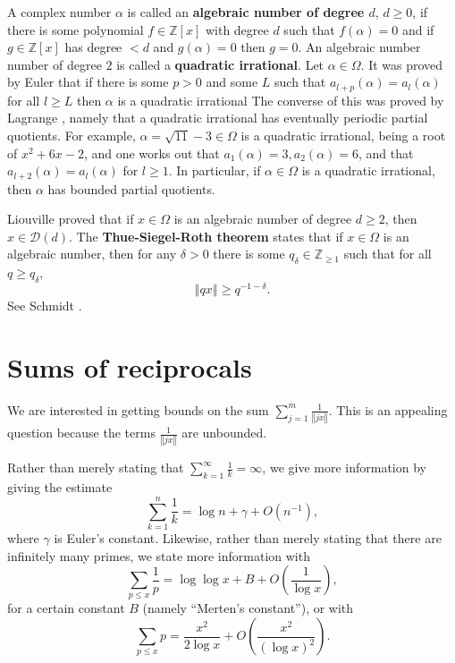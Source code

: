 \documentclass{amsart}
\newcommand{\norm}[1]{\left\Vert #1 \right\Vert}
\begin{document}
A complex number $\alpha$ is called an \textbf{algebraic number of degree $d$}, $d \geq 0$, if there is some polynomial $f \in \mathbb{Z}[x]$ with degree $d$ such that 
$f(\alpha)=0$ and if $g \in \mathbb{Z}[x]$ has degree $<d$ and $g(\alpha)=0$ then $g=0$. 
An algebraic number number of degree $2$ is called a \textbf{quadratic irrational}. 
Let $\alpha \in \Omega$. It was proved by Euler \cite[p.~144, Theorem 176]{wright} that if there is some $p>0$ and some $L$ such that $a_{l+p}(\alpha)=a_l(\alpha)$ for all $l \geq L$ then $\alpha$ is a quadratic irrational The converse of this was proved by Lagrange \cite[p.~144, Theorem 177]{wright},
namely that a quadratic irrational has eventually periodic 
partial quotients.
For example, $\alpha=\sqrt{11}-3 \in \Omega$ is a quadratic irrational, being a root of 
$x^2+6x-2$,
 and one works out
that $a_1(\alpha)=3, a_2(\alpha)=6$, and that $a_{l+2}(\alpha)=a_l(\alpha)$ for $l \geq 1$. 
In particular, if $\alpha \in \Omega$ is a quadratic irrational, then $\alpha$ has bounded partial quotients. 


Liouville \cite[p.~161, Theorem 191]{wright} proved that if $x \in \Omega$ is an algebraic number of degree $d \geq 2$,
then $x \in \mathcal{D}(d)$. 
The \textbf{Thue-Siegel-Roth theorem} \cite[p.~55, Theorem 1.23]{feldman} states that if $x \in \Omega$ is an algebraic number,
then for any
$\delta>0$ there  is some $q_\delta \in \mathbb{Z}_{\geq 1}$ such that for all $q \geq q_\delta$,
\[
\norm{qx} \geq q^{-1-\delta}.
\]
See Schmidt  \cite[p.~195, Theorem 2B]{schmidt}.







\section{Sums of reciprocals}
\label{reciprocalsection}
We are interested in getting bounds on the sum $\sum_{j=1}^m \frac{1}{\norm{jx}}$.
This is an appealing question because the terms $\frac{1}{\norm{jx}}$ are unbounded.

Rather than merely stating that $\sum_{k=1}^\infty \frac{1}{k}=\infty$, we give more information by giving the
 estimate 
 \[
 \sum_{k=1}^n \frac{1}{k} = \log n + \gamma + O(n^{-1}),
 \]
 where $\gamma$ is Euler's constant. Likewise, rather than merely stating that there are infinitely many primes, we state more
 information with \cite[p.~102, \S 28]{handbuch}
 \[
 \sum_{p \leq x} \frac{1}{p} = \log \log x  + B + O\left( \frac{1}{\log x} \right),
 \]
 for a certain constant $B$ (namely ``Merten's constant''),
 or with \cite[p.~226, \S 61]{handbuch}
 \[
 \sum_{p \leq x} p = \frac{x^2}{2\log x}+O\left(\frac{x^2}{(\log x)^2}\right).
 \]
\end{document}
